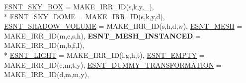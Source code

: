 \begin{DoxyCompactItemize}
\hyperlink{namespaceirr_1_1scene_acad3d7ef92a9807d391ba29120f3b7bdac47a4c2ad206e916f080ad28faed7f3b}{E\+S\+N\+T\+\_\+\+S\+K\+Y\+\_\+\+B\+OX} = M\+A\+K\+E\+\_\+\+I\+R\+R\+\_\+\+ID(\textquotesingle{}s\textquotesingle{},\textquotesingle{}k\textquotesingle{},\textquotesingle{}y\textquotesingle{},\textquotesingle{}\+\_\+\textquotesingle{}), 
\\*
\hyperlink{namespaceirr_1_1scene_acad3d7ef92a9807d391ba29120f3b7bda9bef60dbd27db262591c836beb472160}{E\+S\+N\+T\+\_\+\+S\+K\+Y\+\_\+\+D\+O\+ME} = M\+A\+K\+E\+\_\+\+I\+R\+R\+\_\+\+ID(\textquotesingle{}s\textquotesingle{},\textquotesingle{}k\textquotesingle{},\textquotesingle{}y\textquotesingle{},\textquotesingle{}d\textquotesingle{}), 
\hyperlink{namespaceirr_1_1scene_acad3d7ef92a9807d391ba29120f3b7bda41e004ec85286fba1d14c00273df039e}{E\+S\+N\+T\+\_\+\+S\+H\+A\+D\+O\+W\+\_\+\+V\+O\+L\+U\+ME} = M\+A\+K\+E\+\_\+\+I\+R\+R\+\_\+\+ID(\textquotesingle{}s\textquotesingle{},\textquotesingle{}h\textquotesingle{},\textquotesingle{}d\textquotesingle{},\textquotesingle{}w\textquotesingle{}), 
\hyperlink{namespaceirr_1_1scene_acad3d7ef92a9807d391ba29120f3b7bda25998267ed8640ca0c432df23f1b71fe}{E\+S\+N\+T\+\_\+\+M\+E\+SH} = M\+A\+K\+E\+\_\+\+I\+R\+R\+\_\+\+ID(\textquotesingle{}m\textquotesingle{},\textquotesingle{}e\textquotesingle{},\textquotesingle{}s\textquotesingle{},\textquotesingle{}h\textquotesingle{}), 
{\bfseries E\+S\+N\+T\+\_\+\+M\+E\+S\+H\+\_\+\+I\+N\+S\+T\+A\+N\+C\+ED} = M\+A\+K\+E\+\_\+\+I\+R\+R\+\_\+\+ID(\textquotesingle{}m\textquotesingle{},\textquotesingle{}b\textquotesingle{},\textquotesingle{}f\textquotesingle{},\textquotesingle{}I\textquotesingle{}), 
\\*
\hyperlink{namespaceirr_1_1scene_acad3d7ef92a9807d391ba29120f3b7bda73c87b4a418b0b7dc9d441cdf45f51e3}{E\+S\+N\+T\+\_\+\+L\+I\+G\+HT} = M\+A\+K\+E\+\_\+\+I\+R\+R\+\_\+\+ID(\textquotesingle{}l\textquotesingle{},\textquotesingle{}g\textquotesingle{},\textquotesingle{}h\textquotesingle{},\textquotesingle{}t\textquotesingle{}), 
\hyperlink{namespaceirr_1_1scene_acad3d7ef92a9807d391ba29120f3b7bda977d9500eeb4d4f23e5676a312367f57}{E\+S\+N\+T\+\_\+\+E\+M\+P\+TY} = M\+A\+K\+E\+\_\+\+I\+R\+R\+\_\+\+ID(\textquotesingle{}e\textquotesingle{},\textquotesingle{}m\textquotesingle{},\textquotesingle{}t\textquotesingle{},\textquotesingle{}y\textquotesingle{}), 
\hyperlink{namespaceirr_1_1scene_acad3d7ef92a9807d391ba29120f3b7bda1a0385665a70cacbf1c662e2f6a78759}{E\+S\+N\+T\+\_\+\+D\+U\+M\+M\+Y\+\_\+\+T\+R\+A\+N\+S\+F\+O\+R\+M\+A\+T\+I\+ON} = M\+A\+K\+E\+\_\+\+I\+R\+R\+\_\+\+ID(\textquotesingle{}d\textquotesingle{},\textquotesingle{}m\textquotesingle{},\textquotesingle{}m\textquotesingle{},\textquotesingle{}y\textquotesingle{}), 

\end{DoxyCompactItemize}
